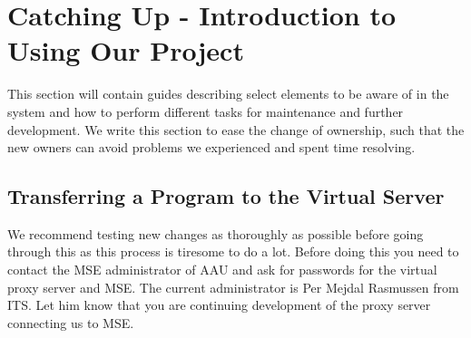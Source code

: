 \section{Catching Up - Introduction to Using Our Project}\label{sec:catchup}
This section will contain guides describing select elements to be aware of in the system and how to perform different tasks for maintenance and further development. We write this section to ease the change of ownership, such that the new owners can avoid problems we experienced and spent time resolving. 

\subsection*{Transferring a Program to the Virtual Server}
We recommend testing new changes as thoroughly as possible before going through this as this process is tiresome to do a lot. Before doing this you need to contact the MSE administrator of AAU and ask for passwords for the virtual proxy server and MSE. The current administrator is Per Mejdal Rasmussen from ITS. Let him know that you are continuing development of the proxy server connecting us to MSE.

